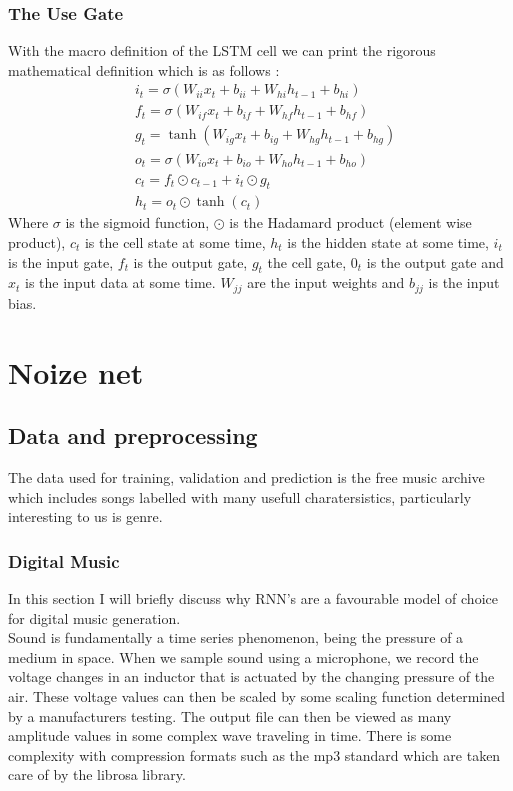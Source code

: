 \documentclass{article}
\begin{document}
\subsubsection{The Use Gate} 
With the macro definition of the LSTM cell we can print the rigorous mathematical definition which is as follows \cite{LSTM}\cite{sak_senior_beaufays_2014}:
\begin{align*}
&i_t = \sigma\left(W_{ii}x_t + b_{ii} + W_{hi}h_{t-1} + b_{hi} \right) \\
&f_t = \sigma\left(W_{if}x_t + b_{if} + W_{hf}h_{t-1} + b_{hf} \right) \\
&g_t = \tanh\left(W_{ig}x_t + b_{ig} + W_{hg}h_{t-1} + b_{hg} \right) \\
&o_t = \sigma\left(W_{io}x_t + b_{io} + W_{ho}h_{t-1} + b_{ho} \right) \\
&c_t = f_t \odot c_{t-1} + i_t \odot g_t \\
&h_t = o_t \odot \tanh(c_t)
\end{align*}
Where $\sigma$ is the sigmoid function, $\odot$ is the Hadamard product (element wise product), $c_t$ is the cell state at some time, $h_t$ is the hidden state at some time, $i_t$ is the input gate, $f_t$ is the output gate, $g_t$ the cell gate, $0_t$ is the output gate and $x_t$ is the input data at some time. $W_{jj}$ are the input weights and $b_{jj}$ is the input bias. 
\section{Noize net}
\label{sec:nn}
\subsection{Data and preprocessing}
The data used for training, validation and prediction is the free music archive which includes songs labelled with many usefull charatersistics, particularly interesting to us is genre.  \cite{fma_dataset}
\cite{fma_challenge}
\subsubsection{Digital Music}
In this section I will briefly discuss why RNN's are a favourable model of choice for digital music generation. \\
Sound is fundamentally a time series phenomenon, being the pressure of a medium in space. When we sample sound using a microphone, we record the voltage changes in an inductor that is actuated by the changing pressure of the air. These voltage values can then be scaled by some scaling function determined by a manufacturers testing. The output file can then be viewed as many amplitude values in some complex wave traveling in time. There is some complexity with compression formats such as the mp3 standard which are taken care of by the librosa library. \cite{isoMP3}
\end{document}
